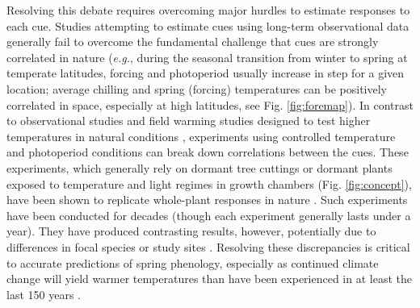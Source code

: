 \documentclass{article}
\begin{document}
\par Resolving this debate requires overcoming major hurdles to estimate responses to each cue. Studies attempting to estimate cues using long-term observational data \emph{\citep[e.g.,][]{zohner2016,vitasse2013}} generally fail to overcome the fundamental challenge that cues are strongly correlated in nature (\emph{e.g.}, during the seasonal transition from winter to spring at temperate latitudes, forcing and photoperiod usually increase in step for a given location; average chilling and spring (forcing) temperatures can be positively correlated in space, especially at high latitudes, see Fig. \ref{fig:foremap}). In contrast to observational studies and field warming studies designed to test higher temperatures in natural conditions \emph{\citep{Wolkovich:2012n}}, experiments using controlled temperature and photoperiod conditions can break down correlations between the cues. These experiments, which generally rely on dormant tree cuttings or dormant plants exposed to temperature and light regimes in growth chambers (Fig. \ref{fig:concept}), have been shown to replicate whole-plant responses in nature \emph{\citep{vitasse2014}}. Such experiments have been conducted for decades (though each experiment generally lasts under a year). They have produced contrasting results, however, potentially due to differences in focal species or study sites \emph{\citep{zohner2016,Caffarra:2011b,Laube:2014a,Basler:2012,Caffarra:2011a}}. Resolving these discrepancies is critical to accurate predictions of spring phenology, especially as continued climate change will yield warmer temperatures than have been experienced in at least the last 150 years \emph{\citep{ohlemuller2006,williams2007,williams2007b,ipcc2013,xu2018}}.
\end{document}
